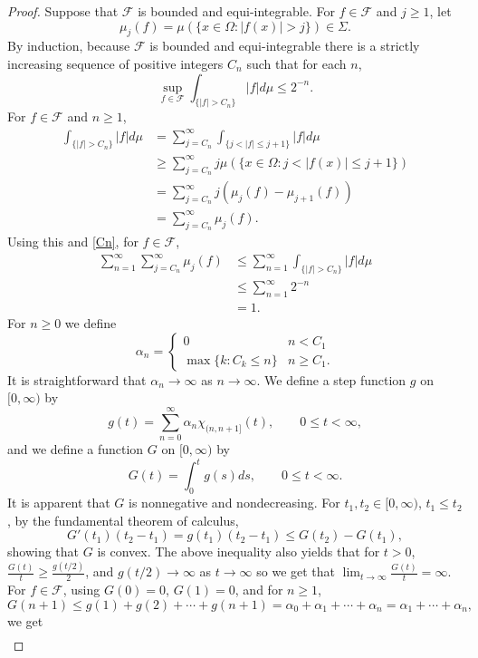 \documentclass{article}
\theoremstyle{definition}
\theoremstyle{definition}
\begin{document}
\begin{proof}
Suppose that $\mathscr{F}$ is bounded and equi-integrable. For $f \in \mathscr{F}$ and $j \geq 1$, let
\[
\mu_j(f) = \mu(\{x \in \Omega: |f(x)| > j\}) \in \Sigma.
\]
By induction, because $\mathscr{F}$ is bounded and equi-integrable there is a strictly increasing sequence
of positive integers $C_n$ such that for each $n$, 
\begin{equation}
\sup_{f \in \mathscr{F}} \int_{\{|f| > C_n\}} |f| d\mu \leq 2^{-n}.
\label{Cn}
\end{equation}
For $f \in \mathscr{F}$ and $n \geq 1$,
\begin{align*}
\int_{\{|f| > C_n\}} |f| d\mu&=\sum_{j=C_n}^\infty \int_{\{j < |f| \leq j+1\}} |f| d\mu\\
&\geq \sum_{j=C_n}^\infty j \mu(\{x \in \Omega: j < |f(x)| \leq j+1\})\\
&= \sum_{j=C_n}^\infty j(\mu_j(f)-\mu_{j+1}(f))\\
&=\sum_{j=C_n}^\infty \mu_j(f).
\end{align*}
Using this and \eqref{Cn}, for $f \in \mathscr{F}$,
\begin{align*}
\sum_{n=1}^\infty \sum_{j=C_n}^\infty \mu_j(f)&\leq \sum_{n=1}^\infty \int_{\{|f| > C_n\}} |f| d\mu\\
&\leq \sum_{n=1}^\infty 2^{-n}\\
&=1.
\end{align*}
For $n \geq 0$ we define
\[
\alpha_n = \begin{cases}
0&n<C_1\\
\max\{k : C_k \leq n\}&n \geq C_1.
\end{cases}
\]
It is straightforward that $\alpha_n \to \infty$ as $n \to \infty$.
We define a step function $g$ on $[0,\infty)$ by 
\[
g(t) = \sum_{n=0}^\infty \alpha_n \chi_{(n,n+1]}(t), \qquad 0 \leq t < \infty,
\]
and we define a function $G$ on $[0,\infty)$ by
\[
G(t) = \int_0^t g(s) ds, \qquad 0 \leq t < \infty.
\]
It is apparent that $G$ is nonnegative and nondecreasing. 
For $t_1,t_2 \in [0,\infty)$, $t_1 \leq t_2$, by the fundamental theorem of calculus,
\[
G'(t_1)(t_2-t_1) = g(t_1)(t_2-t_1) \leq G(t_2)-G(t_1),
\]
showing that $G$ is convex. The above inequality also yields that for $t>0$,
$\frac{G(t)}{t} \geq \frac{g(t/2)}{2}$, and  $g(t/2) \to \infty$ as $t \to \infty$ so we get that
$\lim_{t \to \infty} \frac{G(t)}{t} = \infty$. 
For $f \in \mathscr{F}$,
using $G(0)=0$, $G(1)=0$, and for $n \geq 1$, 
\[
G(n+1) \leq g(1)+g(2)+\cdots+g(n+1) = \alpha_0+ \alpha_1+\cdots+\alpha_n
=\alpha_1+\cdots+\alpha_n,
\]
we get
\begin{align*}

\end{align*}
\end{proof}
\end{document}
